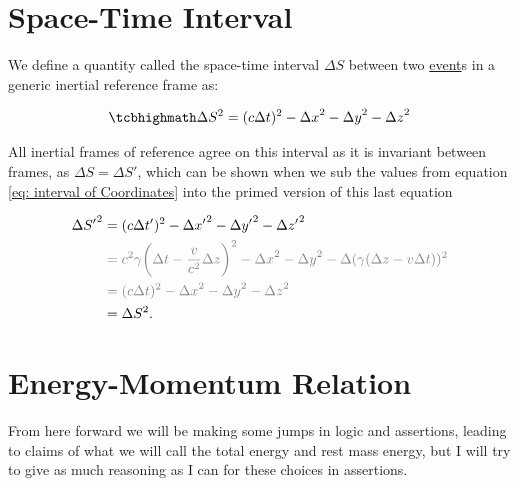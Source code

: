 \section{Space-Time Interval} \label{sect: Space-Time Interval}

We define a quantity called the space-time interval $\Delta S$ between two \hyperlink{def-event}{event}s in a generic inertial reference frame as:

\begin{equation}
	\mhl{
	\Delta S^2 = (c\Delta t)^2-{\Delta x}^2-{\Delta y}^2-{\Delta z}^2
	}
	\label{eq: space-time interval}
\end{equation}

All inertial frames of reference agree on this interval as it is invariant between frames, as $\Delta S = \Delta S{'}$, which can be shown when we sub the values from equation \eqref{eq: interval of Coordinates} into the primed version of this last equation

\begin{equation}
	\begin{aligned}
		\Delta S{'}^2 & = (c{\Delta t{'}})^2-\Delta x{'}^2-{\Delta y{'}}^2-{\Delta z{'}}^2                                                                             \\
		              & \color{gray} = {c}^2{\gamma} \bigg( \Delta t-\frac{v}{{c}^2} {\Delta z} \bigg)^2-{\Delta x}^2-{\Delta y}^2-\Delta ({\gamma} ( {\Delta z}- {v} \Delta t) )^2 \\
		              & \color{gray} = (c\Delta t)^2-{\Delta x}^2-{\Delta y}^2-{\Delta z}^2                                                                                         \\
		              & = \Delta S^2.
	\end{aligned}
\end{equation}

\section{Energy-Momentum Relation} \label{sect: Energy-Momentum Relation}

From here forward we will be making some jumps in logic and assertions, leading to claims of what we will call the total energy and rest mass energy, but I will try to give as much reasoning as I can for these choices in assertions.

